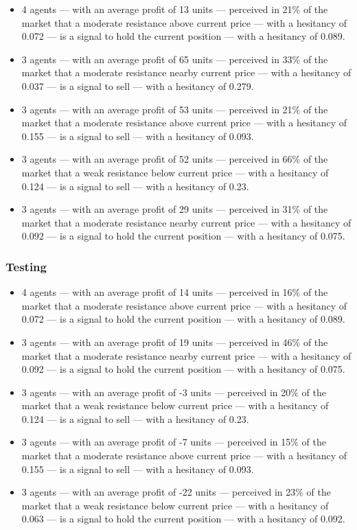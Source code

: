 {\small
  \begin{itemize}
  \item 4 agents — with an average profit of 13 units — perceived in 21\% of the
    market that a moderate resistance above current price — with a hesitancy of
    0.072 — is a signal to hold the current position — with a hesitancy of
    0.089.
  \item 3 agents — with an average profit of 65 units — perceived in 33\% of the
    market that a moderate resistance nearby current price — with a hesitancy of
    0.037 — is a signal to sell — with a hesitancy of 0.279.
  \item 3 agents — with an average profit of 53 units — perceived in 21\% of the
    market that a moderate resistance above current price — with a hesitancy of
    0.155 — is a signal to sell — with a hesitancy of 0.093.
  \item 3 agents — with an average profit of 52 units — perceived in 66\% of the
    market that a weak resistance below current price — with a hesitancy of
    0.124 — is a signal to sell — with a hesitancy of 0.23.
  \item 3 agents — with an average profit of 29 units — perceived in 31\% of the
    market that a moderate resistance nearby current price — with a hesitancy of
    0.092 — is a signal to hold the current position — with a hesitancy of
    0.075.
  \end{itemize}
}

\subsubsection{Testing}
\label{}

{\small
  \begin{itemize}
  \item 4 agents — with an average profit of 14 units — perceived in 16\% of the
    market that a moderate resistance above current price — with a hesitancy of
    0.072 — is a signal to hold the current position — with a hesitancy of
    0.089.
  \item 3 agents — with an average profit of 19 units — perceived in 46\% of the
    market that a moderate resistance nearby current price — with a hesitancy of
    0.092 — is a signal to hold the current position — with a hesitancy of
    0.075.
  \item 3 agents — with an average profit of -3 units — perceived in 20\% of the
    market that a weak resistance below current price — with a hesitancy of
    0.124 — is a signal to sell — with a hesitancy of 0.23.
  \item 3 agents — with an average profit of -7 units — perceived in 15\% of the
    market that a moderate resistance above current price — with a hesitancy of
    0.155 — is a signal to sell — with a hesitancy of 0.093.
  \item 3 agents — with an average profit of -22 units — perceived in 23\% of
    the market that a weak resistance below current price — with a hesitancy of
    0.063 — is a signal to hold the current position — with a hesitancy of
    0.092.
  \end{itemize}
}

